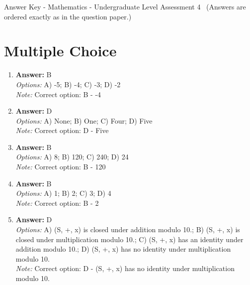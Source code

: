 \documentclass[12pt]{article}
\begin{document}
\begin{center}
Answer Key - Mathematics - Undergraduate Level Assessment 4 \
\small (Answers are ordered exactly as in the question paper.)
\end{center}

\section*{Multiple Choice}
\begin{enumerate}[label=\arabic*.]
\item \textbf{Answer:} B
\\ \textit{Options:} A) -5; B) -4; C) -3; D) -2
\\ \textit{Note:} Correct option: B - -4
\item \textbf{Answer:} D
\\ \textit{Options:} A) None; B) One; C) Four; D) Five
\\ \textit{Note:} Correct option: D - Five
\item \textbf{Answer:} B
\\ \textit{Options:} A) 8; B) 120; C) 240; D) 24
\\ \textit{Note:} Correct option: B - 120
\item \textbf{Answer:} B
\\ \textit{Options:} A) 1; B) 2; C) 3; D) 4
\\ \textit{Note:} Correct option: B - 2
\item \textbf{Answer:} D
\\ \textit{Options:} A) (S, +, x) is closed under addition modulo 10.; B) (S, +, x) is closed under multiplication modulo 10.; C) (S, +, x) has an identity under addition modulo 10.; D) (S, +, x) has no identity under multiplication modulo 10.
\\ \textit{Note:} Correct option: D - (S, +, x) has no identity under multiplication modulo 10.
\end{enumerate}
\end{document}
